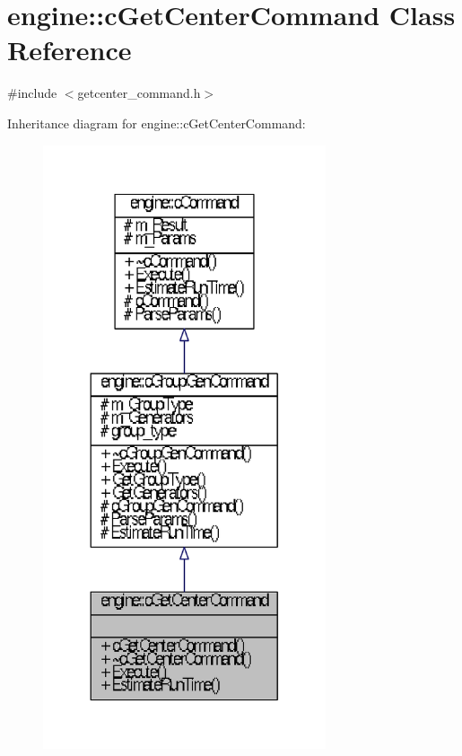 \hypertarget{classengine_1_1cGetCenterCommand}{\section{engine\-:\-:c\-Get\-Center\-Command \-Class \-Reference}
\label{classengine_1_1cGetCenterCommand}
}


{\ttfamily \#include $<$getcenter\-\_\-command.\-h$>$}



\-Inheritance diagram for engine\-:\-:c\-Get\-Center\-Command\-:
\nopagebreak
\begin{figure}[H]
\begin{center}
\leavevmode
\includegraphics[width=236pt]{classengine_1_1cGetCenterCommand__inherit__graph}
\end{center}
\end{figure}


